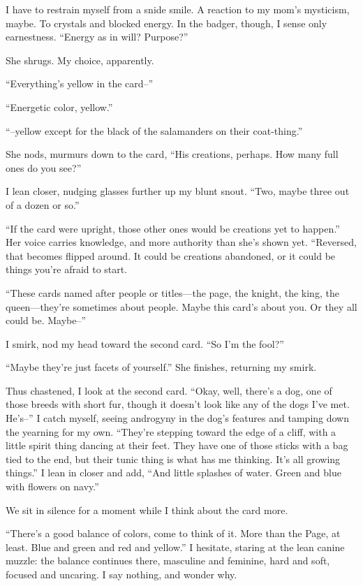 I have to restrain myself from a snide smile. A reaction to my mom's mysticism, maybe. To crystals and blocked energy. In the badger, though, I sense only earnestness. ``Energy as in will? Purpose?''

She shrugs. My choice, apparently.

``Everything's yellow in the card--''

``Energetic color, yellow.''

``--yellow except for the black of the salamanders on their coat-thing.''

She nods, murmurs down to the card, ``His creations, perhaps. How many full ones do you see?''

I lean closer, nudging glasses further up my blunt snout. ``Two, maybe three out of a dozen or so.''

``If the card were upright, those other ones would be creations yet to happen.'' Her voice carries knowledge, and more authority than she's shown yet. ``Reversed, that becomes flipped around. It could be creations abandoned, or it could be things you're afraid to start.

``These cards named after people or titles---the page, the knight, the king, the queen---they're sometimes about people. Maybe this card's about you. Or they all could be. Maybe--''

I smirk, nod my head toward the second card. ``So I'm the fool?''

``Maybe they're just facets of yourself.'' She finishes, returning my smirk.

Thus chastened, I look at the second card. ``Okay, well, there's a dog, one of those breeds with short fur, though it doesn't look like any of the dogs I've met. He's--'' I catch myself, seeing androgyny in the dog's features and tamping down the yearning for my own. ``They're stepping toward the edge of a cliff, with a little spirit thing dancing at their feet. They have one of those sticks with a bag tied to the end, but their tunic thing is what has me thinking. It's all growing things.'' I lean in closer and add, ``And little splashes of water. Green and blue with flowers on navy.''

We sit in silence for a moment while I think about the card more.

``There's a good balance of colors, come to think of it. More than the Page, at least. Blue and green and red and yellow.'' I hesitate, staring at the lean canine muzzle: the balance continues there, masculine and feminine, hard and soft, focused and uncaring. I say nothing, and wonder why.

